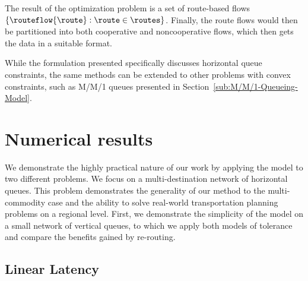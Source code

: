 The result of the optimization problem is a set of route-based flows
$\left\{ \routeflow{\route}:\route\in\routes\right\} $. Finally,
the route flows would then be partitioned into both cooperative and
noncooperative flows, which then gets the data in a suitable format.

While the formulation presented specifically discusses horizontal
queue constraints, the same methods can be extended to other problems
with convex constraints, such as M/M/1 queues presented in Section~\ref{sub:M/M/1-Queueing-Model}.



\section{Numerical results}
\label{sec:le:Numerical-Results}

We demonstrate the highly practical nature of our work by applying
the model to two different problems. We focus on a multi-destination
network of horizontal queues. This problem demonstrates the generality
of our method to the multi-commodity case and the ability to solve
real-world transportation planning problems on a regional level. First,
we demonstrate the simplicity of the model on a small network of vertical
queues, to which we apply both models of tolerance and compare the
benefits gained by re-routing.


\subsection{Linear Latency\label{sub:Linear-Latency}}

